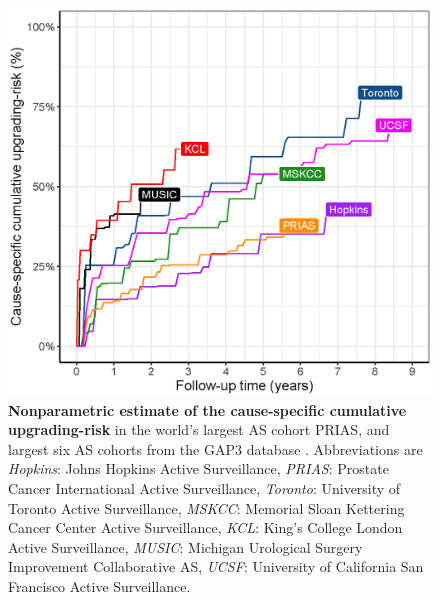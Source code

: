 \begin{figure}[!htb]
\centerline{\includegraphics[width=\columnwidth]{images/npmle_plot.eps}}
\caption{\textbf{Nonparametric estimate \citep{turnbull1976empirical} of the cause-specific cumulative upgrading-risk} in the world's largest AS cohort PRIAS, and largest six AS cohorts from the GAP3 database \citep{gap3_2018}. Abbreviations are \textit{Hopkins}: Johns Hopkins Active Surveillance, \textit{PRIAS}: Prostate Cancer International Active Surveillance, \textit{Toronto}: University of Toronto Active Surveillance, \textit{MSKCC}: Memorial Sloan Kettering Cancer Center Active Surveillance, \textit{KCL}: King's College London Active Surveillance, \textit{MUSIC}: Michigan Urological Surgery Improvement Collaborative AS, \textit{UCSF}: University of California San Francisco Active Surveillance.}
\label{fig:npmle_plot}
\end{figure}

